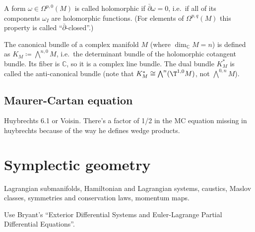\begin{defn}
    A form $\omega\in\Omega^{p,0}(M)$ is called holomorphic if $\bar\partial\omega=0$, i.e.\ if all of its components $\omega_I$ are holomorphic functions. (For elements of $\Omega^{p,q}(M)$ this property is called ``$\bar\partial$-closed''.)
\end{defn}

\begin{defn}
    The canonical bundle of a complex manifold $M$ (where $\dim_\mathbb{C} M=n$) is defined as $K_M\coloneqq \bigwedge^{n,0}M$, i.e.\ the determinant bundle of the holomorphic cotangent bundle. Its fiber is $\mathbb{C}$, so it is a complex line bundle. The dual bundle $K^\ast_M$ is called the anti-canonical bundle (note that $K^\ast_M\cong \bigwedge^n(\T^{1,0}M)$, not $\bigwedge^{0,n}M$).
\end{defn}



\subsection{Maurer-Cartan equation}

Huybrechts 6.1 or Voisin. There's a factor of 1/2 in the MC equation missing in huybrechts because of the way he defines wedge products.




\section{Symplectic geometry}

Lagrangian submanifolds, Hamiltonian and Lagrangian systems, caustics, Maslov classes, symmetries and conservation laws, momentum maps.

Use Bryant's ``Exterior Differential Systems and Euler-Lagrange Partial Differential Equations''.

